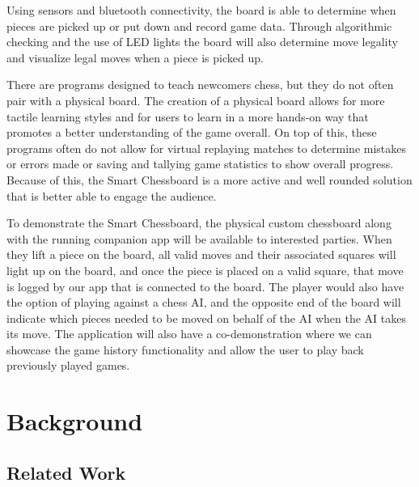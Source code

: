 \documentclass[11pt,journal]{IEEEtran}
\begin{document}
Using sensors and bluetooth connectivity, the board is able to determine when pieces are picked up or put down and record game data. Through algorithmic checking and the use of LED lights the board will also determine move legality and visualize legal moves when a piece is picked up.

There are programs designed to teach newcomers chess, but they do not often pair with a physical board. The creation of a physical board allows for more tactile learning styles and for users to learn in a more hands-on way that promotes a better understanding of the game overall. On top of this, these programs often do not allow for virtual replaying matches to determine mistakes or errors made or saving and tallying game statistics to show overall progress. Because of this, the Smart Chessboard is a more active and well rounded solution that is better able to engage the audience.



To demonstrate the Smart Chessboard, the physical custom chessboard along with the running companion app will be available to interested parties. When they lift a piece on the board, all valid moves and their associated squares will light up on the board, and once the piece is placed on a valid square, that move is logged by our app that is connected to the board. The player would also have the option of playing against a chess AI, and the opposite end of the board will indicate which pieces needed to be moved on behalf of the AI when the AI takes its move. The application will also have a co-demonstration where we can showcase the game history functionality and allow the user to play back previously played games.

\section{Background}



\subsection{Related Work}
\end{document}
